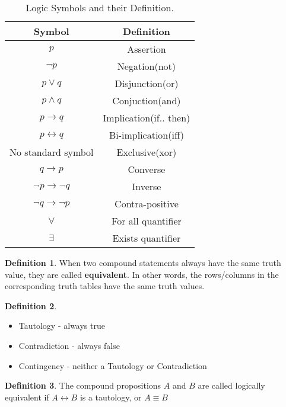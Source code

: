 \documentclass{article}
\theoremstyle{definition}
\newtheorem*{defi}{Definition}
\theoremstyle{definition}
\theoremstyle{named}
\begin{document}
\begin{table}[!h]
\begin{center}
\centering
    \begin{tabular}[t]{|c|c|}
        \hline Symbol & Definition \\ \hline 
         $p$  & Assertion \\
         $\neg p$ & Negation(not) \\ 
         $p \lor q$ & Disjunction(or) \\ 
         $p \land q$ & Conjuction(and) \\
         $p \rightarrow q$ & Implication(if.. then) \\
         $p \leftrightarrow q$ & Bi-implication(iff) \\
         No standard symbol & Exclusive(xor) \\
         $q \rightarrow p$ & Converse \\
         $\neg p \rightarrow \neg q$ & Inverse \\
         $\neg q \rightarrow \neg p$ & Contra-positive \\
         $\forall$ & For all quantifier \\
         $\exists$ & Exists quantifier \\
         \hline
         
    \end{tabular}
    \caption{\label{abc}Logic Symbols and their Definition.}
\end{center}
\end{table}

\begin{defi}
    When two compound statements
always have the same truth value, they are called
\textbf{equivalent}. In other words, the rows/columns in the
corresponding truth tables have the same truth
values.
\end{defi}

\begin{defi}
    \begin{itemize}
        \item Tautology - always true
        \item Contradiction - always false
        \item Contingency - neither a Tautology or Contradiction
    \end{itemize}
\end{defi}

\begin{defi}
    The compound propositions $A$ and $B$ are called logically equivalent if $A \leftrightarrow B$ is a tautology, or $A \equiv B$
\end{defi}
\end{document}
